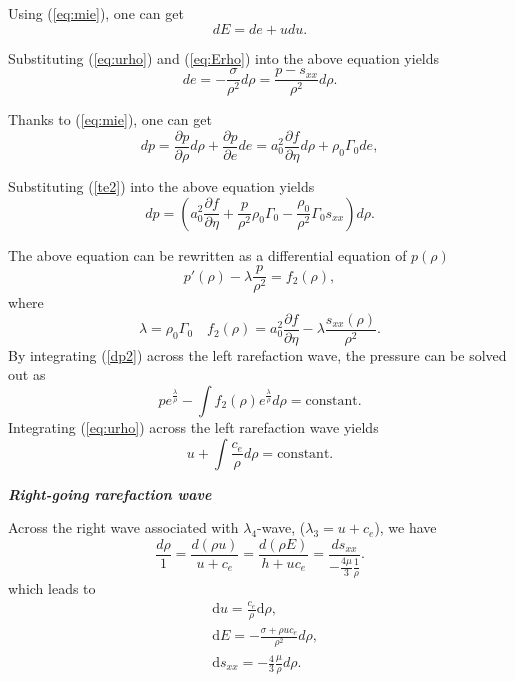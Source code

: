 \documentclass{article}
\numberwithin{equation}{section}
\numberwithin{table}{section}
\begin{document}
Using (\ref{eq:mie}), one can get
\begin{equation}\label{te2}
  dE=de+udu.
\end{equation}

Substituting (\ref{eq:urho}) and (\ref{eq:Erho}) into the above equation yields
\begin{equation}\label{te2}
  d e = -\frac{\sigma}{\rho^2} d\rho=\frac{p-s_{xx}}{\rho^2} d\rho.
\end{equation}

Thanks to (\ref{eq:mie}), one can get
\begin{equation}\label{dp1}
  dp =  \frac{\partial p}{\partial \rho}d \rho +  \frac{\partial p}{\partial e}d e= a_0^2 \frac{\partial f}{\partial \eta} d \rho + \rho_0 \Gamma_0 de,
\end{equation}

Substituting (\ref{te2}) into the above equation yields
\begin{equation}
  dp =  \left( a_0^2 \frac{\partial f}{\partial \eta} + \frac{p}{\rho^2}\rho_0\Gamma_0 -\frac{\rho_0}{\rho^2}\Gamma_0 s_{xx}\right) d\rho.
\end{equation}

The above equation  can  be rewritten as a differential equation of $p(\rho)$
\begin{equation} \label{dp2}
  p'(\rho) - \lambda \frac{p}{\rho^2} = f_2(\rho),
\end{equation}
where
\begin{equation}
  \lambda = \rho_0 \Gamma_0 \quad f_2(\rho) = a_0^2\frac{\partial f}{\partial \eta}- \lambda\frac{s_{xx}(\rho)}{\rho^2}.
\end{equation}
By integrating (\ref{dp2}) across the left rarefaction wave, the pressure can be solved out as
\begin{equation}\label{eq:prhoEL}
  p e^{\frac{\lambda}{\rho}} - \int f_2(\rho) e^{\frac{\lambda}{\rho}}d\rho = \text{constant}.
\end{equation}
Integrating  (\ref{eq:urho}) across the left rarefaction wave yields
\begin{equation}\label{eq:urhoEL}
  u+\int\frac{c_e}{\rho} d\rho = \text{constant}.
\end{equation}

\emph{\textbf{Right-going rarefaction wave} }

Across the right wave associated with $\lambda_4$-wave, ($\lambda_3=u+c_e$), we have
\begin{equation}
  \frac{d\rho}{1} = \frac{d(\rho u)}{u+c_e} = \frac{d(\rho E)}{h+uc_e} = \frac{ds_{xx}}{-\frac{4\mu}{3}\frac{1}{\rho}}.
\end{equation}
which leads to
\begin{align}
  \label{eq:urhoR}
  & \text{d} u =\frac{c_e}{\rho}\text{d}\rho,\\
 \label{eq:ErhoR}
  & \text{d} E = -\frac{\sigma+\rho u c_e}{\rho^2} d\rho,\\
\label{eq:sxxrhoR}
& \text{d} s_{xx} = -\frac{4}{3}\frac{\mu}{\rho} d\rho.
\end{align}
\end{document}
